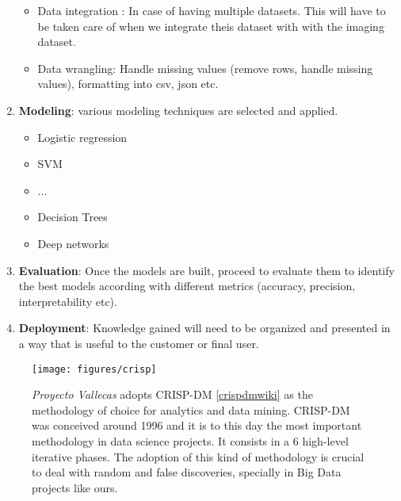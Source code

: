 \documentclass[11pt]{article}
\theoremstyle{definition}
\theoremstyle{remark}
\begin{document}
\begin{enumerate}
\begin{itemize}
		\item Data integration : In case of having multiple datasets. This will have to be taken care of when we integrate theis dataset with with the imaging dataset.
		\item Data wrangling: Handle missing values (remove rows, handle missing values), formatting into csv, json etc.
	\end{itemize}
\item \textbf{Modeling}: various modeling techniques are selected and applied.
	\begin{itemize}
		\item Logistic regression
		\item SVM
		\item ...
		\item Decision Trees
		\item Deep networks
	\end{itemize}
\item \textbf{Evaluation}: Once the models are built, proceed to evaluate them to identify the best models according with different metrics (accuracy, precision, interpretability etc).
\item \textbf{Deployment}: Knowledge gained will need to be organized and presented in a way that is useful to the customer or final user.
\end{enumerate}

\begin{figure}[H]
        \centering
        \texttt{[image: figures/crisp]}
        \caption{\emph{Proyecto Vallecas} adopts CRISP-DM \ref{crispdmwiki} as the methodology of choice for analytics and data mining. CRISP-DM was conceived around 1996 and it is to this day the most important methodology in data science projects. It consists in a 6 high-level iterative phases. The adoption of this kind of methodology is crucial to deal with random and false discoveries, specially in Big Data projects like ours.}\label{fig:crisp}
\end{figure}
\end{document}
